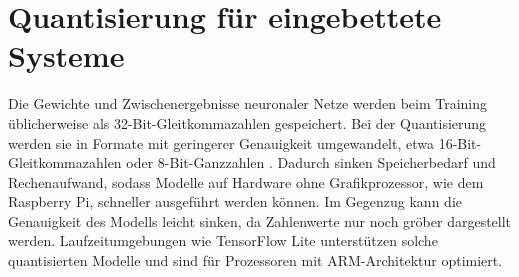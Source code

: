 \section{Quantisierung für eingebettete Systeme}
\label{sec:quantisierung}
Die Gewichte und Zwischenergebnisse neuronaler Netze werden beim Training üblicherweise als 32-Bit-Gleitkommazahlen gespeichert. Bei der Quantisierung werden sie in Formate mit geringerer Genauigkeit umgewandelt, etwa 16-Bit-Gleitkommazahlen oder 8-Bit-Ganzzahlen \cite{jacob2018quantization}. Dadurch sinken Speicherbedarf und Rechenaufwand, sodass Modelle auf Hardware ohne Grafikprozessor, wie dem Raspberry Pi, schneller ausgeführt werden können. Im Gegenzug kann die Genauigkeit des Modells leicht sinken, da Zahlenwerte nur noch gröber dargestellt werden. Laufzeitumgebungen wie TensorFlow Lite \cite{abadi2016tensorflow} unterstützen solche quantisierten Modelle und sind für Prozessoren mit ARM-Architektur optimiert.
